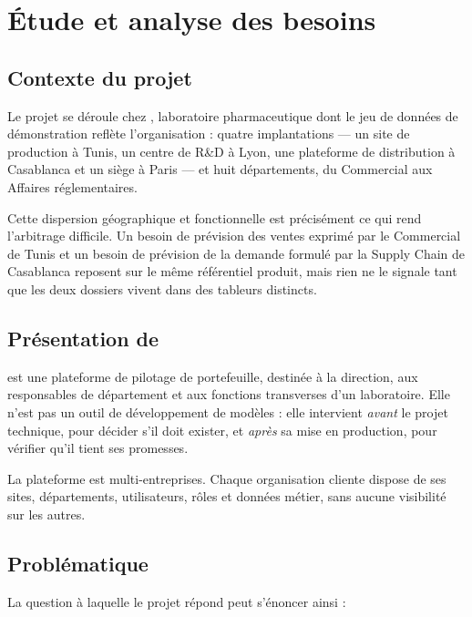 \chapter{Étude et analyse des besoins}
\label{chap:analyse}

\section{Contexte du projet}

Le projet se déroule chez \varEntreprise, laboratoire pharmaceutique dont le jeu de
données de démonstration reflète l'organisation : quatre implantations — un site de
production à Tunis, un centre de R\&D à Lyon, une plateforme de distribution à
Casablanca et un siège à Paris — et huit départements, du Commercial aux Affaires
réglementaires.

Cette dispersion géographique et fonctionnelle est précisément ce qui rend
l'arbitrage difficile. Un besoin de prévision des ventes exprimé par le Commercial de
Tunis et un besoin de prévision de la demande formulé par la Supply Chain de
Casablanca reposent sur le même référentiel produit, mais rien ne le signale tant que
les deux dossiers vivent dans des tableurs distincts.

\section{Présentation de \appname}

\appname{} est une plateforme de pilotage de portefeuille, destinée à la direction, aux
responsables de département et aux fonctions transverses d'un laboratoire. Elle n'est
pas un outil de développement de modèles : elle intervient \emph{avant} le projet
technique, pour décider s'il doit exister, et \emph{après} sa mise en production, pour
vérifier qu'il tient ses promesses.

La plateforme est multi-entreprises. Chaque organisation cliente dispose de ses sites,
départements, utilisateurs, rôles et données métier, sans aucune visibilité sur les
autres.

\section{Problématique}

La question à laquelle le projet répond peut s'énoncer ainsi :

